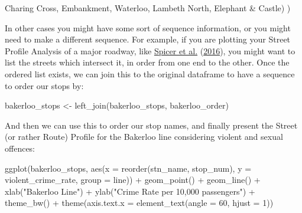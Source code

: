 \documentclass[
  krantz2]{krantz}
\makeatletter
\newenvironment{Shaded}{\begin{snugshade}}{\end{snugshade}}
\newcommand{\AttributeTok}[1]{\textcolor[rgb]{0.61,0.61,0.61}{#1}}
\newcommand{\DecValTok}[1]{\textcolor[rgb]{0.06,0.06,0.06}{#1}}
\newcommand{\FunctionTok}[1]{\textcolor[rgb]{0,0,0}{#1}}
\newcommand{\NormalTok}[1]{#1}
\newcommand{\OtherTok}[1]{\textcolor[rgb]{0.37,0.37,0.37}{#1}}
\newcommand{\SpecialCharTok}[1]{\textcolor[rgb]{0,0,0}{#1}}
\newcommand{\StringTok}[1]{\textcolor[rgb]{0.5,0.5,0.5}{#1}}
\newenvironment{kframe}{%
\medskip{}
\setlength{\fboxsep}{.8em}
 \def\at@end@of@kframe{}%
 \ifinner\ifhmode%
  \def\at@end@of@kframe{\end{minipage}}%
  \begin{minipage}{\columnwidth}%
 \fi\fi%
 \def\FrameCommand##1{\hskip\@totalleftmargin \hskip-\fboxsep
 \colorbox{shadecolor}{##1}\hskip-\fboxsep
     \hskip-\linewidth \hskip-\@totalleftmargin \hskip\columnwidth}%
 \MakeFramed {\advance\hsize-\width
   \@totalleftmargin\z@ \linewidth\hsize
   \@setminipage}}%
 {\par\unskip\endMakeFramed%
 \at@end@of@kframe}
\renewenvironment{Shaded}{\begin{kframe}}{\end{kframe}}
\makeatother
\begin{document}
\begin{Shaded}
\begin{Highlighting}[]
                                           \StringTok{\textquotesingle{}Charing Cross\textquotesingle{}}\NormalTok{,}
                                           \StringTok{\textquotesingle{}Embankment\textquotesingle{}}\NormalTok{,}
                                           \StringTok{\textquotesingle{}Waterloo\textquotesingle{}}\NormalTok{,}
                                           \StringTok{\textquotesingle{}Lambeth North\textquotesingle{}}\NormalTok{,}
                                           \StringTok{\textquotesingle{}Elephant \& Castle\textquotesingle{}}\NormalTok{)}
\NormalTok{)}
\end{Highlighting}
\end{Shaded}

In other cases you might have some sort of sequence information, or you might need to make a different sequence. For example, if you are plotting your Street Profile Analysis of a major roadway, like \protect\hyperlink{ref-Spicer_2016}{Spicer et al.} (\protect\hyperlink{ref-Spicer_2016}{2016}), you might want to list the streets which intersect it, in order from one end to the other. Once the ordered list exists, we can join this to the original dataframe to have a sequence to order our stops by:

\begin{Shaded}
\begin{Highlighting}[]
\NormalTok{bakerloo\_stops }\OtherTok{\textless{}{-}} \FunctionTok{left\_join}\NormalTok{(bakerloo\_stops, bakerloo\_order)}
\end{Highlighting}
\end{Shaded}

And then we can use this to order our stop names, and finally present the Street (or rather Route) Profile for the Bakerloo line considering violent and sexual offences:

\begin{Shaded}
\begin{Highlighting}[]
\FunctionTok{ggplot}\NormalTok{(bakerloo\_stops, }\FunctionTok{aes}\NormalTok{(}\AttributeTok{x =} \FunctionTok{reorder}\NormalTok{(stn\_name, stop\_num), }\AttributeTok{y =}\NormalTok{ violent\_crime\_rate, }\AttributeTok{group =}\NormalTok{ line)) }\SpecialCharTok{+} 
  \FunctionTok{geom\_point}\NormalTok{() }\SpecialCharTok{+} 
  \FunctionTok{geom\_line}\NormalTok{() }\SpecialCharTok{+} 
  \FunctionTok{xlab}\NormalTok{(}\StringTok{"Bakerloo Line"}\NormalTok{) }\SpecialCharTok{+} 
  \FunctionTok{ylab}\NormalTok{(}\StringTok{"Crime Rate per 10,000 passengers"}\NormalTok{) }\SpecialCharTok{+} 
  \FunctionTok{theme\_bw}\NormalTok{() }\SpecialCharTok{+} 
  \FunctionTok{theme}\NormalTok{(}\AttributeTok{axis.text.x =} \FunctionTok{element\_text}\NormalTok{(}\AttributeTok{angle =} \DecValTok{60}\NormalTok{, }\AttributeTok{hjust =} \DecValTok{1}\NormalTok{))}
\end{Highlighting}
\end{Shaded}
\end{document}
